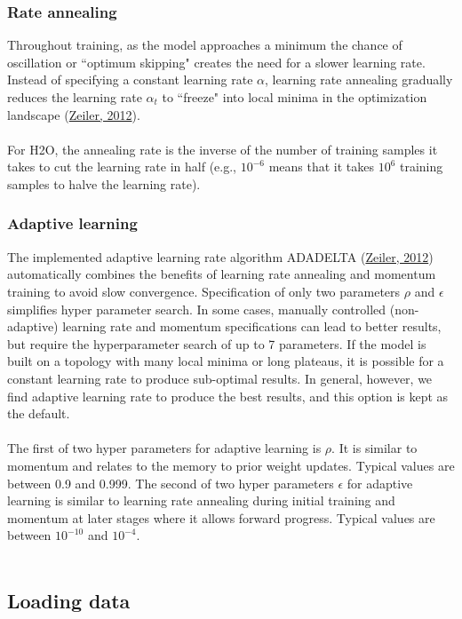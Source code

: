 \documentclass[11pt]{article}
\begin{document}
\subsubsection{Rate annealing} \label{2.4.2}

Throughout training, as the model approaches a minimum the chance of oscillation or ``optimum skipping" creates the need for a slower learning rate. Instead of specifying a constant learning rate $\alpha$, learning rate annealing gradually reduces the learning rate $\alpha_t$ to ``freeze" into local minima in the optimization landscape (\href{http://arxiv.org/pdf/1212.5701v1.pdf}{Zeiler, 2012}).  
\\
\\
For H2O, the annealing rate is the inverse of the number of training samples it takes to cut the learning rate in half (e.g., $10^{-6}$ means that it takes $10^6$ training samples to halve the learning rate).

\subsubsection{Adaptive learning} \label{2.4.3}
The implemented adaptive learning rate algorithm ADADELTA (\href{http://arxiv.org/pdf/1212.5701v1.pdf}{Zeiler, 2012})  automatically combines the benefits of learning rate annealing and momentum training to avoid slow convergence. Specification of only two parameters $\rho$ and $\epsilon$  simplifies hyper parameter search. In some cases, manually controlled (non-adaptive) learning rate and momentum specifications can lead to better results, but require the hyperparameter search of up to 7 parameters. If the model is built on a topology with many local minima or long plateaus, it is possible for a constant learning rate to produce sub-optimal results. In general, however, we find adaptive learning rate to produce the best results, and this option is kept as the default. 
\\
\\
The first of two hyper parameters for adaptive learning is $\rho$. It is similar to momentum and relates to the memory to prior weight updates. Typical values are between 0.9 and 0.999. The second of two hyper parameters $\epsilon$ for adaptive learning is similar to learning rate annealing during initial training and momentum at later stages where it allows forward progress.
Typical values are between $10^{-10}$ and $10^{-4}$.
\\
\\
\subsection{Loading data} \label{2.5}
\end{document}
